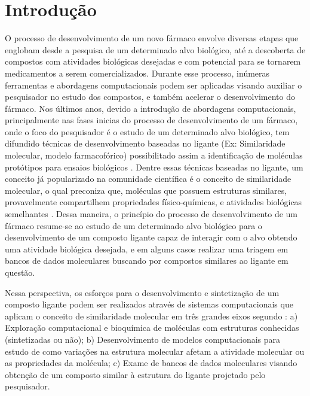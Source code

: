 \chapter{Introdu\c{c}\~ao}
O processo de desenvolvimento de um novo fármaco envolve diversas etapas que englobam desde a pesquisa de um determinado alvo biológico, até a descoberta de compostos com atividades biológicas desejadas e com potencial para se tornarem medicamentos a serem comercializados. Durante esse processo, inúmeras ferramentas e abordagens computacionais podem ser aplicadas visando auxiliar o pesquisador no estudo dos compostos, e também acelerar o desenvolvimento do fármaco. Nos últimos anos, devido a introdução de abordagens computacionais, principalmente nas fases inicias do processo de desenvolvimento de um fármaco, onde o foco do pesquisador é o estudo de um determinado alvo biológico,  tem difundido técnicas de desenvolvimento baseadas no ligante (Ex: Similaridade molecular, modelo farmacofórico) possibilitado assim a identificação de moléculas protótipos para ensaios biológicos \cite{rodrigues2012}. Dentre essas técnicas baseadas no ligante, um conceito já popularizado na comunidade científica é o conceito de similaridade molecular, o qual preconiza que, moléculas que possuem estruturas similares, provavelmente compartilhem propriedades físico-químicas, e atividades biológicas semelhantes \cite{singh2004reasoning}. Dessa maneira, o princípio do processo de desenvolvimento de um fármaco resume-se ao estudo de um determinado alvo biológico para o desenvolvimento de um composto ligante capaz de interagir com o alvo obtendo uma atividade biológica desejada, e em alguns casos realizar uma triagem em bancos de dados moleculares buscando por compostos similares ao ligante em questão.

Nessa perspectiva, os esforços para o desenvolvimento e sintetização de um composto ligante podem ser realizados através de sistemas computacionais que aplicam o conceito de similaridade molecular em três grandes eixos segundo : a) Exploração computacional e bioquímica de moléculas com estruturas conhecidas (sintetizadas ou não); b) Desenvolvimento de modelos computacionais para estudo de como variações na estrutura molecular afetam a atividade molecular ou as propriedades da molécula; c) Exame de bancos de dados moleculares visando obtenção de um composto similar à estrutura do ligante projetado pelo pesquisador. 

